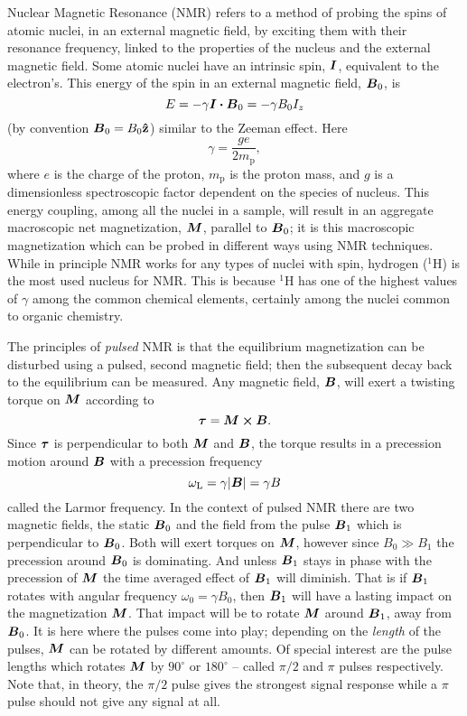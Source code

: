 \documentclass[11pt,a4paper, twocolumn,
swedish, english %
]{article}
\begin{document}
Nuclear Magnetic Resonance (NMR) refers to a method of probing the
spins of atomic nuclei, in an external magnetic field, by exciting
them with their resonance frequency, linked to the properties of the
nucleus and the external magnetic field. Some atomic nuclei have an
intrinsic spin, $\vb*I$, equivalent to the electron's. This energy of
the spin in an external magnetic field, $\vb*B_0$, is
\begin{equation}\label{eq:mag-energy}
E=-\gamma\vb*I\vdot\vb*B_0=-\gamma B_0 I_z
\end{equation}
(by convention $\vb*B_0=B_0\vu{z}$) similar to the Zeeman effect. Here
\begin{equation}
\gamma=\frac{ge}{2m_\text{p}},
\end{equation}
where $e$ is the charge of the proton, $m_\text{p}$ is the proton
mass, and $g$ is a dimensionless spectroscopic factor dependent on the
species of nucleus. This energy coupling, among all the nuclei in a
sample, will result in an aggregate macroscopic net magnetization,
$\vb*M$, parallel to $\vb*B_0$; it is this macroscopic magnetization which
can be probed in different ways using NMR techniques. 
While in principle NMR works for any types of nuclei with spin,
hydrogen ($^1\!$H) is the most used nucleus for NMR. This is because
$^1\!$H has one of the highest values of $\gamma$ among the common
chemical elements, certainly among the nuclei common to organic
chemistry. 

The principles of \emph{pulsed} NMR is that the equilibrium
magnetization can be disturbed using a pulsed, second magnetic field;
then the subsequent decay back to the equilibrium can be
measured. Any magnetic field, $\vb*B$, will exert a twisting torque on
$\vb*M$ according to
\begin{equation}
\vb*\tau=\vb*M\cross\vb*B.
\end{equation}
Since $\vb*\tau$ is perpendicular to both $\vb*M$ and $\vb*B$, the
torque results in a precession motion around $\vb*B$ with a
precession frequency \cite[ch. 2.1]{Principles_MR1990}
\begin{equation}
\omega_\text{L} = \gamma \abs{\vb*B}= \gamma B
\end{equation}
called the Larmor frequency. 
In the context of pulsed NMR there are two magnetic fields, the static
$\vb*B_0$ and the field from the pulse $\vb*B_1$ which is
perpendicular to $\vb*B_0$. Both will exert torques on $\vb*M$,
however since $B_0\gg B_1$ the precession around $\vb*B_0$ is
dominating. And unless $\vb*B_1$ stays in phase with the precession of
$\vb*M$ the time averaged effect of $\vb*B_1$ will diminish. That is
if $\vb*B_1$ rotates\footnotemark{} with angular frequency
$\omega_0=\gamma B_0$, then $\vb*B_1$ will have a lasting impact on
the magnetization $\vb*M$. That impact will be to rotate $\vb*M$
around $\vb*B_1$, away from $\vb*B_0$. It is here where the pulses
come into play; depending on the \emph{length} of the pulses, $\vb*M$
can be rotated by different amounts. Of special interest are the pulse
lengths which rotates $\vb*M$ by $90^\circ$ or $180^\circ$ -- called
$\pi/2$ and $\pi$ pulses respectively. Note that, in theory, the
$\pi/2$ pulse gives the strongest signal response while a $\pi$ pulse
should not give any signal at all.
\end{document}
